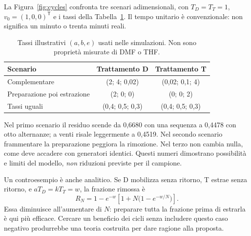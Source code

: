 \documentclass[11pt,reqno]{amsart}
\numberwithin{equation}{section}
\begin{document}
La Figura~\ref{fig:cycles} confronta tre scenari adimensionali,
con $T_D=T_T=1$, $v_0=(1,0,0)^{\mathsf T}$ e i tassi della
Tabella~\ref{tab:rates}. Il tempo unitario \`e convenzionale:
non significa un minuto o trenta minuti reali.

\begin{table}[htbp]
\caption{Tassi illustrativi $(a,b,e)$ usati nelle simulazioni.
Non sono propriet\`a misurate di DMF o THF.}
\label{tab:rates}\centering\small
\begin{tabular}{@{}lcc@{}}\toprule
Scenario & Trattamento D & Trattamento T\\\midrule
Complementare &(2; 4; 0{,}02)&(0{,}02; 0{,}1; 4)\\
Preparazione poi estrazione &(2; 0; 0)&(0; 0; 2)\\
Tassi uguali &(0{,}4; 0{,}5; 0{,}3)&(0{,}4; 0{,}5; 0{,}3)\\\bottomrule
\end{tabular}
\end{table}

Nel primo scenario il residuo scende da 0,6680 con una sequenza
a 0,4478 con otto alternanze; a venti risale leggermente a 0,4519.
Nel secondo scenario frammentare la preparazione peggiora la
rimozione. Nel terzo non cambia nulla, come deve accadere con
generatori identici. Questi numeri dimostrano possibilit\`a e limiti
del modello, \emph{non} riduzioni previste per il campione.

Un controesempio \`e anche analitico. Se D mobilizza senza ritorno,
T estrae senza ritorno, e $aT_D=kT_T=w$, la frazione rimossa \`e
\begin{equation}\label{eq:counterexample}
 R_N=1-e^{-w}\left[1+N\bigl(1-e^{-w/N}\bigr)\right].
\end{equation}
Essa diminuisce all'aumentare di $N$: preparare tutta la frazione
prima di estrarla \`e qui pi\`u efficace. Cercare un beneficio dei
cicli senza includere questo caso negativo produrrebbe una teoria
costruita per dare ragione alla proposta.
\end{document}
